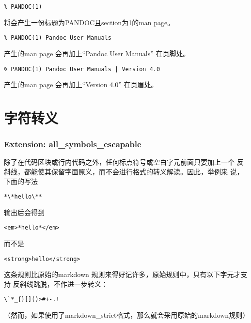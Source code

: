 \documentclass[fancyhdr,bookmark]{ctexbook}
\begin{document}
\begin{lstlisting}
% PANDOC(1)
\end{lstlisting}

将会产生一份标题为PANDOC且section为1的man page。

\begin{lstlisting}
% PANDOC(1) Pandoc User Manuals
\end{lstlisting}

产生的man page 会再加上``Pandoc User Manuals'' 在页脚处。

\begin{lstlisting}
% PANDOC(1) Pandoc User Manuals | Version 4.0
\end{lstlisting}

产生的man page 会再加上``Version 4.0'' 在页眉处。

\section{字符转义}\label{ux5b57ux7b26ux8f6cux4e49}

\subsubsection{Extension:
all\_symbols\_escapable}\label{extension-all_symbols_escapable}

除了在代码区块或行内代码之外，任何标点符号或空白字元前面只要加上一个
反斜线，都能使其保留字面原义，而不会进行格式的转义解读。因此，举例来
说，下面的写法

\begin{lstlisting}
*\*hello\**
\end{lstlisting}

输出后会得到

\begin{lstlisting}
<em>*hello*</em>
\end{lstlisting}

而不是

\begin{lstlisting}
<strong>hello</strong>
\end{lstlisting}

这条规则比原始的markdown
规则来得好记许多，原始规则中，只有以下字元才支持
反斜线跳脱，不作进一步转义：

\begin{lstlisting}
\`*_{}[]()>#+-.!
\end{lstlisting}

（然而，如果使用了markdown\_strict格式，那么就会采用原始的markdown规则）
\end{document}
